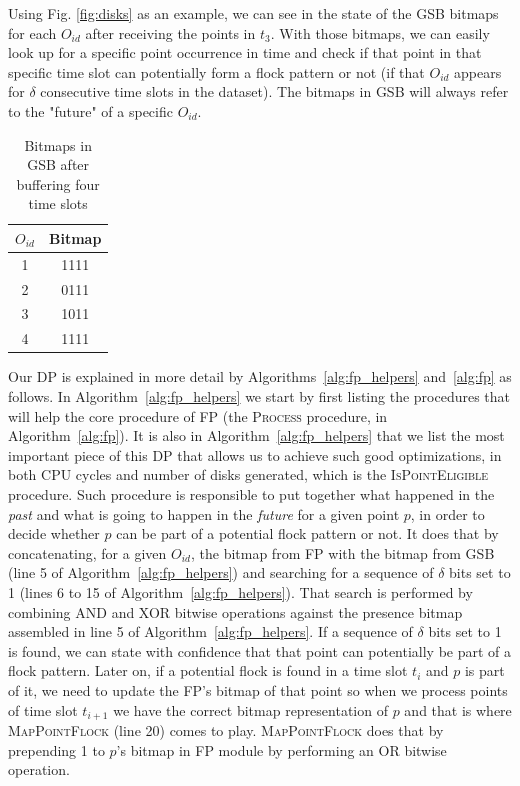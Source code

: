 Using Fig. \ref{fig:disks} as an example, we can see in  the state of the GSB bitmaps for each
$O_{id}$ after receiving the points in $t_3$. With those bitmaps, we can easily look up for a specific point occurrence
in time and check if that point in that specific time slot can potentially form a flock pattern or not (if that $O_{id}$
appears for $\delta$ consecutive time slots in the dataset). The bitmaps in GSB will always refer to the "future" of a
specific $O_{id}$.

\begin{table}[h!]
    \renewcommand{\arraystretch}{1.3}
    \caption{Bitmaps in GSB after buffering four time slots}
    \label{tab:bitmaps}
    \centering
    \begin{tabular}{c|c}
        \hline
        $O_{id}$ &   Bitmap\\
        \hline
        \hline
        1        &   1111\\
        \hline
        2        &   0111\\
        \hline
        3        &   1011\\
        \hline
        4        &   1111\\
        \hline
    \end{tabular}
\end{table}

Our DP is explained in more detail by Algorithms~\ref{alg:fp_helpers} and~\ref{alg:fp} as follows. In
Algorithm~\ref{alg:fp_helpers} we start by first listing the procedures that will help the core procedure of FP (the
\textsc{Process} procedure, in Algorithm~\ref{alg:fp}). It is also in Algorithm~\ref{alg:fp_helpers} that we list the
most important piece of this DP that allows us to achieve such good optimizations, in both CPU cycles and number of
disks generated, which is the \textsc{IsPointEligible} procedure. Such procedure is responsible to put together what
happened in the \textit{past} and what is going to happen in the \textit{future} for a given point $p$, in order to
decide whether $p$ can be part of a potential flock pattern or not. It does that by concatenating, for a given $O_{id}$,
the bitmap from FP with the bitmap from GSB (line 5 of Algorithm~\ref{alg:fp_helpers}) and searching for a sequence of
$\delta$ bits set to 1 (lines 6 to 15 of Algorithm~\ref{alg:fp_helpers}). That search is performed by combining AND and
XOR bitwise operations against the presence bitmap assembled in line 5 of Algorithm~\ref{alg:fp_helpers}. If a sequence
of $\delta$ bits set to 1 is found, we can state with confidence that that point can potentially be part of a flock
pattern. Later on, if a potential flock is found in a time slot $t_i$ and $p$ is part of it, we need to update the FP's
bitmap of that point so when we process points of time slot $t_{i+1}$ we have the correct bitmap representation of $p$
and that is where \textsc{MapPointFlock} (line 20) comes to play. \textsc{MapPointFlock} does that by prepending 1 to
$p$'s bitmap in FP module by performing an OR bitwise operation.

